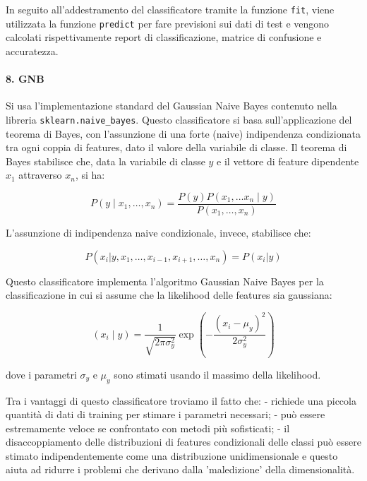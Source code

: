 \documentclass[11pt]{article}
\begin{document}
In seguito all'addestramento del classificatore tramite la funzione
\texttt{fit}, viene utilizzata la funzione \texttt{predict} per fare
previsioni sui dati di test e vengono calcolati rispettivamente report
di classificazione, matrice di confusione e accuratezza.

    \paragraph{8. GNB}\label{gnb}

    Si usa l'implementazione standard del Gaussian Naive Bayes contenuto
nella libreria \texttt{sklearn.naive\_bayes}. Questo classificatore si
basa sull'applicazione del teorema di Bayes, con l'assunzione di una
forte (naive) indipendenza condizionata tra ogni coppia di features,
dato il valore della variabile di classe. Il teorema di Bayes stabilisce
che, data la variabile di classe \(y\) e il vettore di feature
dipendente \(x_1\) attraverso \(x_n\), si ha:

\begin{equation*}
P(y \mid x_1, \dots, x_n) = \frac{P(y) P(x_1, \dots x_n \mid y)} {P(x_1, \dots, x_n)}
\end{equation*}

L'assunzione di indipendenza naive condizionale, invece, stabilisce che:

\begin{equation*}
P(x_i | y, x_1, \dots, x_{i-1}, x_{i+1}, \dots, x_n) = P(x_i | y)
\end{equation*}

Questo classificatore implementa l'algoritmo Gaussian Naive Bayes per la
classificazione in cui si assume che la likelihood delle features sia
gaussiana:

\begin{equation*}
(x_i \mid y) = \frac{1}{\sqrt{2\pi\sigma^2_y}} \exp\left(-\frac{(x_i - \mu_y)^2}{2\sigma^2_y}\right)
\end{equation*}

dove i parametri \(\sigma_y\) e \(\mu_y\) sono stimati usando il massimo
della likelihood.

Tra i vantaggi di questo classificatore troviamo il fatto che: -
richiede una piccola quantità di dati di training per stimare i
parametri necessari; - può essere estremamente veloce se confrontato con
metodi più sofisticati; - il disaccoppiamento delle distribuzioni di
features condizionali delle classi può essere stimato indipendentemente
come una distribuzione unidimensionale e questo aiuta ad ridurre i
problemi che derivano dalla 'maledizione' della dimensionalità.
\end{document}
